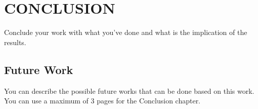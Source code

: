 \chapter{CONCLUSION}
\par Conclude your work with what you've done and what is the implication of the results.

\section{Future Work}
\par You can describe the possible future works that can be done based on this work. You can use a maximum of 3 pages for the Conclusion chapter.

